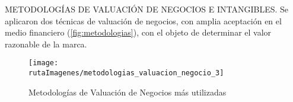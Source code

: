 

\textcolor{secundario}{METODOLOG\'IAS DE VALUACI\'ON DE NEGOCIOS E INTANGIBLES}. Se aplicaron dos \textcolor{principal}{t\'ecnicas de valuaci\'on de negocios}, con amplia aceptaci\'on en el medio financiero (\autoref{fig:metodologias}), con el objeto de determinar el \textcolor{principal}{valor razonable de la marca.}\\

\begin{figure}[H]
\centering
\caption{Metodolog\'ias de Valuaci\'on de Negocios m\'as utilizadas\label{fig:metodologias}}
\texttt{[image: \\rutaImagenes/metodologias\_valuacion\_negocio\_3]}\\

\end{figure}
